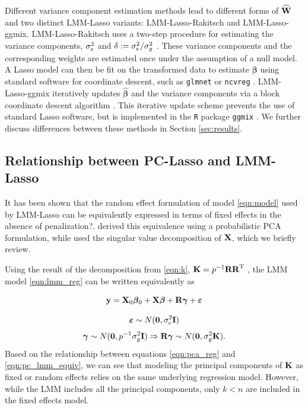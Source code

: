Different variance component estimation methods lead to different forms of $\widehat{\textbf{W}}$ and two distinct LMM-Lasso variants: LMM-Lasso-Rakitsch and LMM-Lasso-ggmix. LMM-Lasso-Rakitsch uses a two-step procedure for estimating the variance components, $\sigma^2_e$ and $\delta := \sigma^2_e / \sigma^2_g$ \citep{Rakitsch2012}. These variance components and the corresponding weights are estimated once under the assumption of a null model. A Lasso model can then be fit on the transformed data to estimate $\boldsymbol{\beta}$ using standard software for coordinate descent, such as \texttt{glmnet} \citep{glmnet} or \texttt{ncvreg} \citep{ncvreg}. LMM-Lasso-ggmix iteratively updates $\widehat{\boldsymbol{\beta}}$ and the variance components via a block coordinate descent algorithm \citep{bhatnagar2019simultaneous}. This iterative update scheme prevents the use of standard Lasso software, but is implemented in the \texttt{R} package \texttt{ggmix} \citep{ggmix}. We further discuss differences between these methods in Section \ref{sec:results}.



\subsection{Relationship between PC-Lasso and LMM-Lasso}

It has been shown that the random effect formulation of model \eqref{eqn:model} used by LMM-Lasso can be equivalently expressed in terms of fixed effects in the absence of penalization?. \citet{zhang2015principal} derived this equivalence using a probabilistic PCA formulation, while \citet{hoffman2013correcting} used the singular value decomposition of $\textbf{X}$, which we briefly review.

Using the result of the decomposition from \eqref{eqn:k}, $\textbf{K} = p^{-1} \textbf{R} \textbf{R}^{\text{T}}$ , the LMM model \eqref{eqn:lmm_reg} can be written equivalently as

\begin{equation}
    \label{eqn:pc_lmm_equiv}
    \textbf{y} = \textbf{X}_0 \boldsymbol{\beta}{}_0 + \textbf{X} \boldsymbol{\beta}{} + \textbf{R} \boldsymbol{\gamma} + \boldsymbol{\varepsilon}{}
\end{equation}

$$ \boldsymbol{\varepsilon}{} \sim N(\boldsymbol{0}, \sigma^2_e \textbf{I}) $$
$$ \boldsymbol{\gamma} \sim N(\boldsymbol{0}, p^{-1} \sigma^2_g \textbf{I}) \Rightarrow \textbf{R} \boldsymbol{\gamma} \sim N(\boldsymbol{0}, \sigma^2_g \textbf{K}).$$
Based on the relationship between equations \eqref{eqn:pca_reg} and \eqref{eqn:pc_lmm_equiv}, we can see that modeling the principal components of $\textbf{K}$ as fixed or random effects relies on the same underlying regression model. However, while the LMM includes all the principal components, only $k < n$ are included in the fixed effects model. 

